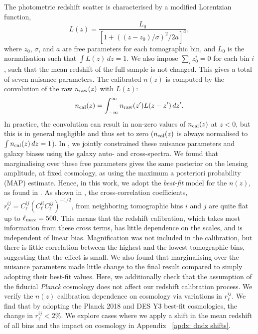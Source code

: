 \documentclass[twocolumn]{aastex631}
\newcommand{\Ellen}[1]{\textcolor{orange}{(QH: #1)}}
\begin{document}
{{The photometric redshift scatter is characterised by a modified Lorentzian function,
\begin{equation}
    L(z)=\frac{L_0}{[1+((z-z_0)/\sigma)^2/2a]^a},
    \label{eq: lorentz}
\end{equation}
where $z_0$, $\sigma$, and $a$ are free parameters for each tomographic bin, and $L_0$ is the normalisation such that $\int L(z)\,dz=1$. We also impose $\sum_i z_0^i=0$ for each bin $i$, such that the mean redshift of the full sample is not changed. This gives a total of seven nuisance parameters.
The calibrated $n(z)$ is computed by the convolution of the raw $n_{\rm raw}(z)$ with $L(z)$:
\begin{equation}
    n_{\rm cal}(z)=\int_{-\infty}^{\infty} n_{\rm raw}(z') L(z-z')\, dz'.
\end{equation}
In practice, the convolution can result in non-zero values of $n_{\rm cal}(z)$ at $z<0$, but this is in general negligible and thus set to zero ($n_{\rm cal}(z)$ is always normalised to $\int n_{\rm cal}(z) \, dz=1$). In \cite{hang2021}, we jointly constrained these nuisance parameters and galaxy biases using the galaxy auto- and cross-spectra. We found that marginalising over these free parameters gives the same posterior on the lensing amplitude, at fixed cosmology, as using the maximum a posteriori probability (MAP) estimate. Hence, in this work, we adopt the \textit{best-fit} model for the $n(z)$, as found in \cite{hang2021}.}
As shown in \cite{hang2021}, the cross-correlation coefficients, $r_{\ell}^{ij}=C_{\ell}^{ij}(C_{\ell}^{ii}C_{\ell}^{jj})^{-1/2}$, from neighboring tomographic bins $i$ and $j$ are quite flat up to $\ell_{\rm max}=500$. This means that the redshift calibration, which takes most information from these cross terms, has little dependence on the scales, and is independent of linear bias. Magnification was not included in the calibration, but there is little correlation between the highest and the lowest tomographic bins, suggesting that the effect is small. We also found that marginalising over the nuisance parameters made little change to the final result compared to simply adopting their best-fit values.
Here, we additionally check that the assumption of the fiducial \textit{Planck} cosmology does not affect our redshift calibration process. We verify the $n(z)$ calibration dependence on cosmology via variations in $r_{\ell}^{ij}$. We find that by adopting the Planck 2018 and DES Y3 best-fit cosmologies, the change in $r_{\ell}^{ij}<2\%$. 
We explore cases where we apply a shift in the mean redshift of all bins and the impact on cosmology in Appendix ~\ref{apdx: dndz shifts}.


}
\end{document}
